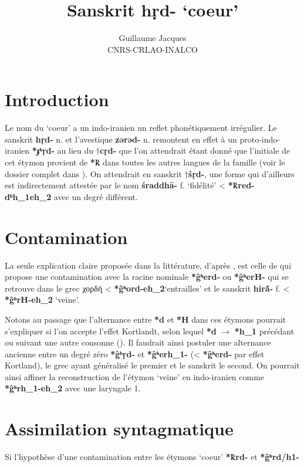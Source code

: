 \documentclass{article}
\newcommand{\ipa}[1]{{\phon\textbf{#1}}}
\newcommand{\grec}[1]{{\mleccha #1}}
\begin{document}
 
\title{Sanskrit \ipa{hṛd-} `coeur'}
\author{Guillaume Jacques\\ CNRS-CRLAO-INALCO}
\maketitle

\section*{Introduction}
Le nom du `coeur' a un indo-iranien un reflet phonétiquement irrégulier. Le sanskrit \ipa{hṛd-} n. et l'avestique \ipa{zərəd-} n. remontent en effet à un proto-indo-iranien \ipa{*ɟʰṛd-} au lieu du $\dagger$\ipa{cṛd-} que l'on attendrait étant donné que l'initiale de cet étymon provient de \ipa{*ḱ} dans toutes les autres langues de la famille (voir le dossier complet dans \citealt[417-423]{wodtko08NIL}). On attendrait en sanskrit $\dagger$\ipa{śṛd-}, une forme qui d'ailleurs est indirectement attestée par le nom \ipa{śraddhā-} f. `fidélité' < \ipa{*ḱred-dʰh_1eh_2} avec un degré différent.

\section{Contamination}
La seule explication claire proposée dans la littérature, d'après \citet[420]{wodtko08NIL}, est celle de \citet{szemerenyi70heart} qui propose une contamination avec la racine nominale \ipa{*ĝʰerd-} ou \ipa{*ĝʰerH-} qui se retrouve dans le grec \grec{χορδή} < \ipa{*ĝʰord-eh_2}`entrailles' et le sanskrit \ipa{hirā́-} f. < \ipa{*ĝʰrH-eh_2} `veine'. 

Notons au passage que l'alternance entre \ipa{*d} et \ipa{*H} dans ces étymons pourrait s'expliquer si l'on accepte l'effet Kortlandt, selon lequel \ipa{*d} $\rightarrow$ \ipa{*h_1} précédant ou suivant  une autre consonne (\citealt{kortlandt83numerals, garnier14kortlandt}). Il faudrait ainsi postuler une alternance ancienne entre un degré zéro \ipa{*ĝʰṛd-} et  \ipa{*ĝʰerh_1-} (< \ipa{*ĝʰerd-} par effet Kortland), le grec ayant généralisé le premier et le sanskrit le second. On pourrait ainsi affiner la reconstruction de l'étymon `veine' en indo-iranien comme \ipa{*ĝʰrh_1-eh_2} avec une laryngale 1.


\section{Assimilation syntagmatique}
Si l'hypothèse d'une contamination entre les étymons `coeur' \ipa{*k̂rd-} et \ipa{*ĝʰrd/h1-}
\end{document}
